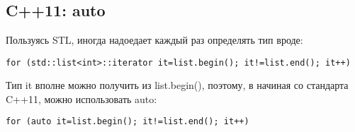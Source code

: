 ﻿\section{}

\subsection{C++11: auto}

Пользуясь \ac{STL}, иногда надоедает каждый раз определять тип  вроде:

\begin{lstlisting}
for (std::list<int>::iterator it=list.begin(); it!=list.end(); it++)
\end{lstlisting}

Тип it вполне можно получить из list.begin(), поэтому, в начиная со стандарта C++11, можно использовать auto:

\begin{lstlisting}
for (auto it=list.begin(); it!=list.end(); it++)
\end{lstlisting}

